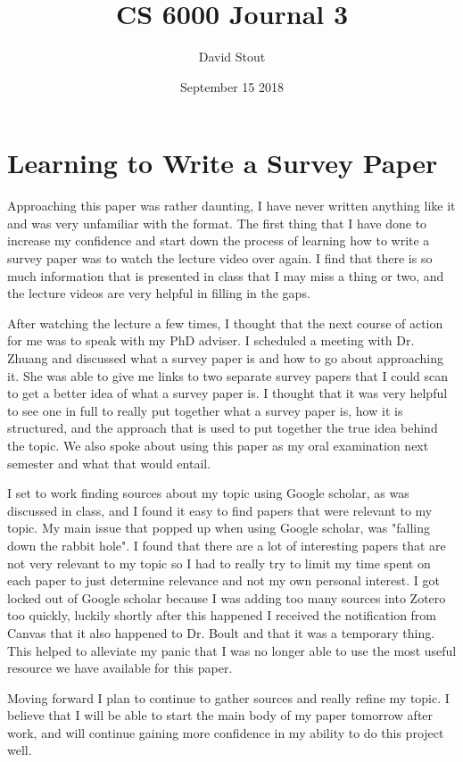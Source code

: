 \documentclass{article}
\title{CS 6000 Journal 3}
\author{David Stout}
\date{September 15 2018}
\begin{document}
\maketitle

\section{Learning to Write a Survey Paper}
Approaching this paper was rather daunting, I have never written anything like it and was very unfamiliar with the format. The first thing that I have done to increase my confidence and start down the process of learning how to write a survey paper was to watch the lecture video over again. I find that there is so much information that is presented in class that I may miss a thing or two, and the lecture videos are very helpful in filling in the gaps.

After watching the lecture a few times, I thought that the next course of action for me was to speak with my PhD adviser. I scheduled a meeting with Dr. Zhuang and discussed what a survey paper is and how to go about approaching it. She was able to give me links to two separate survey papers that I could scan to get a better idea of what a survey paper is. I thought that it was very helpful to see one in full to really put together what a survey paper is, how it is structured, and the approach that is used to put together the true idea behind the topic. We also spoke about using this paper as my oral examination next semester and what that would entail. 

I set to work finding sources about my topic using Google scholar, as was discussed in class, and I found it easy to find papers that were relevant to my topic. My main issue that popped up when using Google scholar, was "falling down the rabbit hole". I found that there are a lot of interesting papers that are not very relevant to my topic so I had to really try to limit my time spent on each paper to just determine relevance and not my own personal interest. I got locked out of Google scholar because I was adding too many sources into Zotero too quickly, luckily shortly after this happened I received the notification from Canvas that it also happened to Dr. Boult and that it was a temporary thing. This helped to alleviate my panic that I was no longer able to use the most useful resource we have available for this paper.

Moving forward I plan to continue to gather sources and really refine my topic. I believe that I will be able to start the main body of my paper tomorrow after work, and will continue gaining more confidence in my ability to do this project well.
\end{document}
